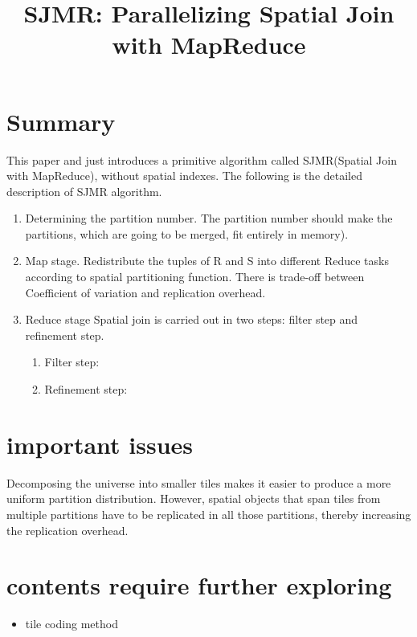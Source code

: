 \documentclass[conference]{IEEEtran}
\begin{document}
	
	\title{SJMR: Parallelizing Spatial Join with MapReduce}	
	\maketitle
	\IEEEpeerreviewmaketitle	
	\section{Summary}
	This paper and just introduces a primitive algorithm called SJMR(Spatial Join with MapReduce), without spatial indexes. The following is the detailed description of SJMR algorithm.
	\begin{enumerate}
		\item Determining the partition number. The partition number should make the partitions, which are going to be merged, fit entirely in memory).
		\item Map stage. Redistribute the tuples of R and S into different Reduce tasks according to spatial partitioning function. There is trade-off between Coefficient of variation and replication overhead.
		\item Reduce stage Spatial join is carried out in two steps: filter step and refinement step.
		\begin{enumerate}
			\item Filter step:
			\item Refinement step:
		\end{enumerate}
	\end{enumerate}
	\section{important issues}
	Decomposing the universe into smaller tiles makes it easier
	to produce a more uniform partition distribution. However,
	spatial objects that span tiles from multiple partitions have
	to be replicated in all those partitions, thereby increasing the replication overhead.
	\section{contents require further exploring}
	\begin{itemize}
		\item tile coding method
	\end{itemize}
\end{document}
